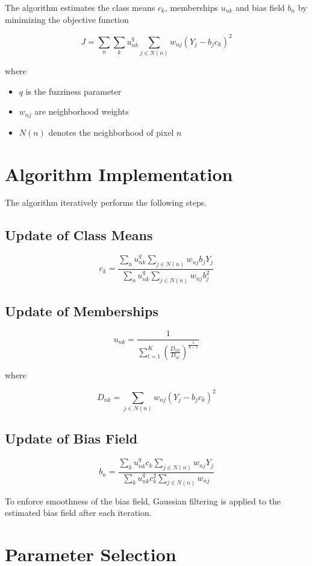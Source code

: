 \documentclass[11pt]{article}
\begin{document}
The algorithm estimates the class means $c_k$, memberships $u_{nk}$ and bias field $b_n$ by minimizing the objective function

\[
J = \sum_n \sum_k u_{nk}^{q}
\sum_{j \in N(n)} w_{nj}(Y_j - b_j c_k)^2
\]

where

\begin{itemize}
\item $q$ is the fuzziness parameter
\item $w_{nj}$ are neighborhood weights
\item $N(n)$ denotes the neighborhood of pixel $n$
\end{itemize}

\section{Algorithm Implementation}

The algorithm iteratively performs the following steps.

\subsection{Update of Class Means}

\[
c_k =
\frac{\sum_n u_{nk}^q \sum_{j \in N(n)} w_{nj} b_j Y_j}
{\sum_n u_{nk}^q \sum_{j \in N(n)} w_{nj} b_j^2}
\]

\subsection{Update of Memberships}

\[
u_{nk} =
\frac{1}{\sum_{l=1}^{K}
\left(\frac{D_{nk}}{D_{nl}}\right)^{\frac{1}{q-1}}}
\]

where

\[
D_{nk} = \sum_{j \in N(n)} w_{nj}(Y_j - b_j c_k)^2
\]

\subsection{Update of Bias Field}

\[
b_n =
\frac{\sum_k u_{nk}^q c_k
\sum_{j \in N(n)} w_{nj} Y_j}
{\sum_k u_{nk}^q c_k^2
\sum_{j \in N(n)} w_{nj}}
\]

To enforce smoothness of the bias field, Gaussian filtering is applied to the estimated bias field after each iteration.

\section{Parameter Selection}
\end{document}
